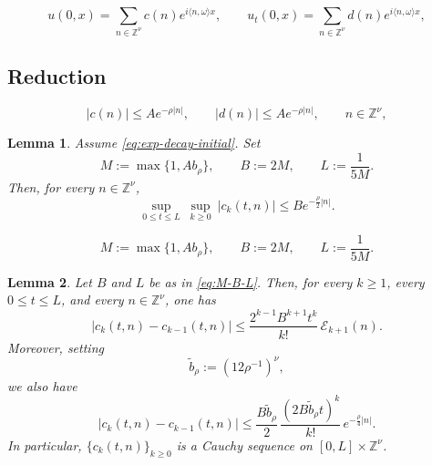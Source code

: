 \documentclass[10pt,a4paper]{amsart}
\newtheorem{lemma}{Lemma}
\begin{document}
\begin{equation}\label{eq:IBq-data-intro}
    u(0,x)=\sum_{n\in\mathbb{Z}^{\nu}}c(n)e^{i\langle n,\omega\rangle x},
    \qquad
    u_t(0,x)=\sum_{n\in\mathbb{Z}^{\nu}}d(n)e^{i\langle n,\omega\rangle x},
\end{equation}

\subsection{Reduction}\label{sec:reduction}

\begin{equation}\label{eq:exp-decay-initial}
|c(n)|\leq A e^{-\rho |n|},
\qquad
|d(n)|\leq A e^{-\rho |n|},
\qquad n\in \mathbb{Z}^{\nu},
\end{equation}

\begin{lemma}\label{lem:uniform-exp-decay}
Assume \eqref{eq:exp-decay-initial}. Set
\begin{equation}\label{eq:M-B-L}
M:=\max\{1,Ab_{\rho}\},
\qquad
B:=2M,
\qquad
L:=\frac{1}{5M}.
\end{equation}
Then, for every $n\in \mathbb{Z}^{\nu}$,
\begin{equation}\label{eq:uniform-exp-decay}
\sup_{0\leq t\leq L}\ \sup_{k\geq 0}\ |c_k(t,n)|
\leq
B e^{-\frac{\rho}{2}|n|}.
\end{equation}
\end{lemma}

\begin{equation}
M:=\max\{1,Ab_{\rho}\},
\qquad
B:=2M,
\qquad
L:=\frac{1}{5M}.
\end{equation}

\begin{lemma}\label{lem:cauchy-estimate}
Let $B$ and $L$ be as in \eqref{eq:M-B-L}. Then, for every $k\geq 1$, every
$0\leq t\leq L$, and every $n\in \mathbb{Z}^{\nu}$, one has
\begin{equation}\label{eq:cauchy-estimate-1}
|c_k(t,n)-c_{k-1}(t,n)|
\leq
\frac{2^{k-1}B^{k+1}t^k}{k!}\,\mathcal{E}_{k+1}(n).
\end{equation}
Moreover, setting
\begin{equation*}
\widetilde b_{\rho}:=(12\rho^{-1})^{\nu},
\end{equation*}
we also have
\begin{equation}\label{eq:cauchy-estimate-2}
|c_k(t,n)-c_{k-1}(t,n)|
\leq
\frac{B\widetilde b_{\rho}}{2}\,
\frac{(2B\widetilde b_{\rho}t)^k}{k!}\,
e^{-\frac{\rho}{4}|n|}.
\end{equation}
In particular, $\{c_k(t,n)\}_{k\geq 0}$ is a Cauchy sequence on
$[0,L]\times \mathbb{Z}^{\nu}$.
\end{lemma}
\end{document}
